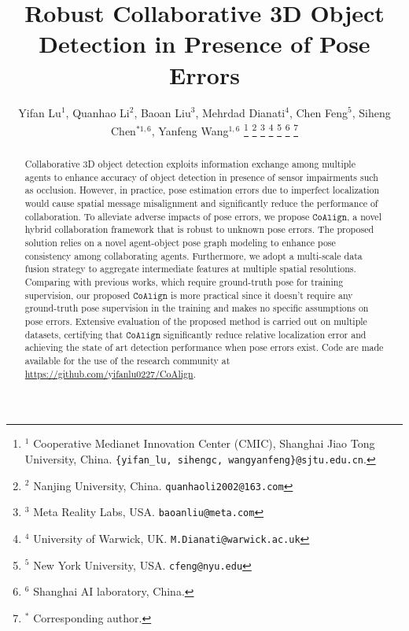 \documentclass[letterpaper, 10 pt, conference]{ieeeconf}  %
\title{\LARGE \bf
Robust Collaborative 3D Object Detection in Presence of Pose Errors}
\author{Yifan Lu$^{1}$, Quanhao Li$^{2}$, Baoan Liu$^{3}$, Mehrdad Dianati$^{4}$, Chen Feng$^{5}$, Siheng Chen$^{*1,6}$, Yanfeng Wang$^{1,6}$ 
    \thanks{$^{1}$ Cooperative Medianet Innovation Center (CMIC), Shanghai Jiao Tong University, China.
            {\tt\small \{yifan\_lu, sihengc, wangyanfeng\}@sjtu.edu.cn}.}
    \thanks{$^{2}$ Nanjing University, China.
            {\tt\small quanhaoli2002@163.com}}
    \thanks{$^{3}$ Meta Reality Labs, USA.
            {\tt\small baoanliu@meta.com}}
    \thanks{$^{4}$ University of Warwick, UK.
            {\tt\small M.Dianati@warwick.ac.uk}}
    \thanks{$^{5}$ New York University, USA.
            {\tt\small cfeng@nyu.edu}}
    \thanks{$^{6}$ Shanghai AI laboratory, China.}
    \thanks{$^{*}$ Corresponding author.}
}
\begin{document}
\maketitle
\thispagestyle{empty}
\pagestyle{empty}

\begin{abstract}

Collaborative 3D object detection exploits information exchange among multiple agents to enhance accuracy of object detection in presence of sensor impairments such as occlusion. However, in practice, pose estimation errors due to imperfect localization would cause spatial message misalignment and significantly reduce the performance of collaboration. To alleviate adverse impacts of pose errors, we propose $\mathtt{CoAlign}$, a novel hybrid collaboration framework that is robust to unknown pose errors. The proposed solution relies on a novel agent-object pose graph modeling to enhance pose consistency among collaborating agents. Furthermore, we adopt a multi-scale data fusion strategy to aggregate intermediate features at multiple spatial resolutions. Comparing with previous works, which require ground-truth pose for training supervision, our proposed $\mathtt{CoAlign}$ is more practical since it doesn't require any ground-truth pose supervision in the training and makes no specific assumptions on pose errors. Extensive evaluation of the proposed method is carried out on multiple datasets, certifying that $\mathtt{CoAlign}$ significantly reduce relative localization error and achieving the state of art detection performance when pose errors exist. Code are made available for the use of the research community at \href{https://github.com/yifanlu0227/CoAlign}{https://github.com/yifanlu0227/CoAlign}.
\end{abstract}


\vspace{-3mm}
\end{document}
